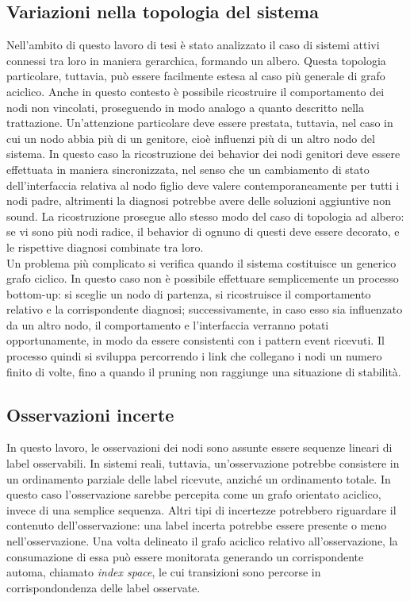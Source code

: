 \subsection{Variazioni nella topologia del sistema}
Nell'ambito di questo lavoro di tesi è stato analizzato il caso di sistemi attivi connessi tra loro in maniera gerarchica, formando un albero. Questa topologia particolare, tuttavia, può essere facilmente estesa al caso più generale di grafo aciclico. Anche in questo contesto è possibile ricostruire il comportamento dei nodi non vincolati, proseguendo in modo analogo a quanto descritto nella trattazione. Un'attenzione particolare deve essere prestata, tuttavia, nel caso in cui un nodo abbia più di un genitore, cioè influenzi più di un altro nodo del sistema. In questo caso la ricostruzione dei behavior dei nodi genitori deve essere effettuata in maniera sincronizzata, nel senso che un cambiamento di stato dell'interfaccia relativa al nodo figlio deve valere contemporaneamente  per tutti i nodi padre, altrimenti la diagnosi potrebbe avere delle soluzioni aggiuntive non sound. La ricostruzione prosegue allo stesso modo del caso di topologia ad albero: se vi sono più nodi radice, il behavior di ognuno di questi deve essere decorato, e le rispettive diagnosi combinate tra loro.\\
Un problema più complicato si verifica quando il sistema costituisce un generico grafo ciclico. In questo caso non è possibile effettuare semplicemente un processo bottom-up: si sceglie un nodo di partenza, si ricostruisce il comportamento relativo e la corrispondente diagnosi; successivamente, in caso esso sia influenzato da un altro nodo, il comportamento e l'interfaccia verranno potati opportunamente, in modo da essere consistenti con i pattern event ricevuti. Il processo quindi si sviluppa percorrendo i link che collegano i nodi un numero finito di volte, fino a quando il pruning non raggiunge una situazione di stabilità. 

\subsection{Osservazioni incerte}
In questo lavoro, le osservazioni dei nodi sono assunte essere sequenze lineari di label osservabili. In sistemi reali, tuttavia, un'osservazione potrebbe consistere in un ordinamento parziale delle label ricevute, anziché un ordinamento totale. In questo caso l'osservazione sarebbe percepita come un grafo orientato aciclico, invece di una semplice sequenza. Altri tipi di incertezze potrebbero riguardare il contenuto dell'osservazione: una label incerta potrebbe essere presente o meno nell'osservazione. Una volta delineato il grafo aciclico relativo all'osservazione, la consumazione di essa può essere monitorata generando un corrispondente automa, chiamato \emph{index space}, le cui transizioni sono percorse in corrispondondenza delle label osservate.


